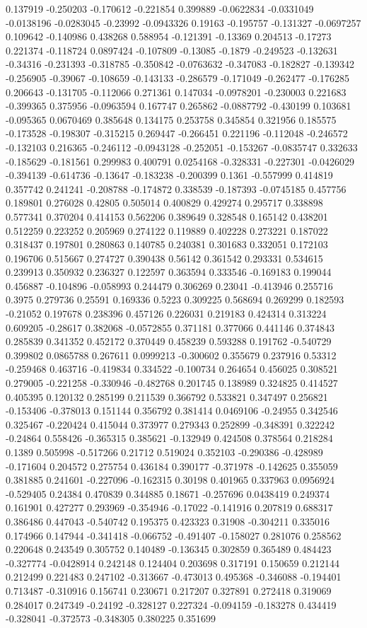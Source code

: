 0.137919 -0.250203 -0.170612 -0.221854 0.399889 -0.0622834 -0.0331049 -0.0138196 -0.0283045 -0.23992 -0.0943326 0.19163 -0.195757 -0.131327 -0.0697257 0.109642 -0.140986 0.438268 0.588954 -0.121391 -0.13369 0.204513 -0.17273 0.221374 -0.118724 0.0897424 -0.107809 -0.13085 -0.1879 -0.249523 -0.132631 -0.34316 -0.231393 -0.318785 -0.350842 -0.0763632 -0.347083 -0.182827 -0.139342 -0.256905 -0.39067 -0.108659 -0.143133 -0.286579 -0.171049 -0.262477 -0.176285 0.206643 -0.131705 -0.112066 0.271361 0.147034 -0.0978201 -0.230003 0.221683 -0.399365 0.375956 -0.0963594 0.167747 0.265862 -0.0887792 -0.430199 0.103681 -0.095365 0.0670469 0.385648 0.134175 0.253758 0.345854 0.321956 0.185575 -0.173528 -0.198307 -0.315215 0.269447 -0.266451 0.221196 -0.112048 -0.246572 -0.132103 0.216365 -0.246112 -0.0943128 -0.252051 -0.153267 -0.0835747 0.332633 -0.185629 -0.181561 0.299983 0.400791 0.0254168 -0.328331 -0.227301 -0.0426029 -0.394139 -0.614736 -0.13647 -0.183238 -0.200399 0.1361 -0.557999 0.414819 0.357742 0.241241 -0.208788 -0.174872 0.338539 -0.187393 -0.0745185 0.457756 0.189801 0.276028 0.42805 0.505014 0.400829 0.429274 0.295717 0.338898 0.577341 0.370204 0.414153 0.562206 0.389649 0.328548 0.165142 0.438201 0.512259 0.223252 0.205969 0.274122 0.119889 0.402228 0.273221 0.187022 0.318437 0.197801 0.280863 0.140785 0.240381 0.301683 0.332051 0.172103 0.196706 0.515667 0.274727 0.390438 0.56142 0.361542 0.293331 0.534615 0.239913 0.350932 0.236327 0.122597 0.363594 0.333546 -0.169183 0.199044 0.456887 -0.104896 -0.058993 0.244479 0.306269 0.23041 -0.413946 0.255716 0.3975 0.279736 0.25591 0.169336 0.5223 0.309225 0.568694 0.269299 0.182593 -0.21052 0.197678 0.238396 0.457126 0.226031 0.219183 0.424314 0.313224 0.609205 -0.28617 0.382068 -0.0572855 0.371181 0.377066 0.441146 0.374843 0.285839 0.341352 0.452172 0.370449 0.458239 0.593288 0.191762 -0.540729 0.399802 0.0865788 0.267611 0.0999213 -0.300602 0.355679 0.237916 0.53312 -0.259468 0.463716 -0.419834 0.334522 -0.100734 0.264654 0.456025 0.308521 0.279005 -0.221258 -0.330946 -0.482768 0.201745 0.138989 0.324825 0.414527 0.405395 0.120132 0.285199 0.211539 0.366792 0.533821 0.347497 0.256821 -0.153406 -0.378013 0.151144 0.356792 0.381414 0.0469106 -0.24955 0.342546 0.325467 -0.220424 0.415044 0.373977 0.279343 0.252899 -0.348391 0.322242 -0.24864 0.558426 -0.365315 0.385621 -0.132949 0.424508 0.378564 0.218284 0.1389 0.505998 -0.517266 0.21712 0.519024 0.352103 -0.290386 -0.428989 -0.171604 0.204572 0.275754 0.436184 0.390177 -0.371978 -0.142625 0.355059 0.381885 0.241601 -0.227096 -0.162315 0.30198 0.401965 0.337963 0.0956924 -0.529405 0.24384 0.470839 0.344885 0.18671 -0.257696 0.0438419 0.249374 0.161901 0.427277 0.293969 -0.354946 -0.17022 -0.141916 0.207819 0.688317 0.386486 0.447043 -0.540742 0.195375 0.423323 0.31908 -0.304211 0.335016 0.174966 0.147944 -0.341418 -0.066752 -0.491407 -0.158027 0.281076 0.258562 0.220648 0.243549 0.305752 0.140489 -0.136345 0.302859 0.365489 0.484423 -0.327774 -0.0428914 0.242148 0.124404 0.203698 0.317191 0.150659 0.212144 0.212499 0.221483 0.247102 -0.313667 -0.473013 0.495368 -0.346088 -0.194401 0.713487 -0.310916 0.156741 0.230671 0.217207 0.327891 0.272418 0.319069 0.284017 0.247349 -0.24192 -0.328127 0.227324 -0.094159 -0.183278 0.434419 -0.328041 -0.372573 -0.348305 0.380225 0.351699 